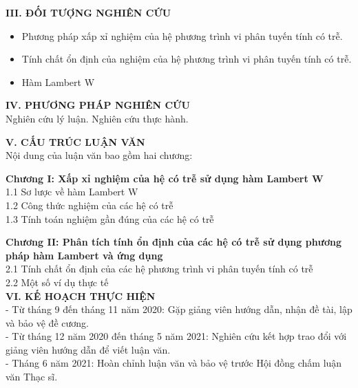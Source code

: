 \documentclass[12pt,oneside,portrait,a4paper]{book}
\theoremstyle{definition}
\theoremstyle{plain}
\begin{document}
\vspace{6pt}
\noindent 
\textbf{ III. ĐỐI TƯỢNG NGHIÊN CỨU}
\begin{itemize}
\item Phương pháp xấp xỉ nghiệm của hệ phương trình vi phân tuyến tính có trễ.
\item Tính chất ổn định của nghiệm của hệ phương trình vi phân tuyến tính có trễ.
\item Hàm Lambert W
\end{itemize}

\pagebreak

\vspace{6pt}
\noindent 
\textbf{ IV. PHƯƠNG PHÁP NGHIÊN CỨU}\\
\hspace*{0,5cm} Nghiên cứu lý luận. Nghiên cứu thực hành.

\vspace{6pt}
\noindent 
\textbf{ V. CẤU TRÚC LUẬN VĂN}\\
\hspace*{1cm} Nội dung của luận văn bao gồm hai chương:


\hspace*{0,5cm}\textbf{Chương I: Xấp xỉ nghiệm của hệ có trễ sử dụng hàm Lambert W}\\
\hspace*{1cm} 1.1 Sơ lược về hàm Lambert W \\
\hspace*{1cm} 1.2 Công thức nghiệm của các hệ có trễ \\
\hspace*{1cm} 1.3 Tính toán nghiệm gần đúng của các hệ có trễ 

\vskip 0.5cm 
\hspace*{0,5cm}\textbf{Chương II: Phân tích tính ổn định của các hệ có trễ sử dụng phương pháp hàm Lambert và ứng dụng}\\
\hspace*{1cm} 2.1 Tính chất ổn định của các hệ phương trình vi phân tuyến tính có trễ \\
\hspace*{1cm} 2.2 Một số ví dụ thực tế \\

\vspace{6pt}
\noindent 
\textbf{ VI. KẾ HOẠCH THỰC HIỆN}\\
\hspace*{1cm} - Từ tháng 9 đến tháng 11 năm 2020: Gặp giảng viên hướng dẫn, nhận đề tài, lập và bảo vệ đề cương.\\
\hspace*{1cm} - Từ tháng 12 năm 2020 đến tháng 5 năm 2021: Nghiên cứu kết hợp trao đổi với giảng viên hướng dẫn để viết luận văn.\\
\hspace*{1cm} - Tháng 6 năm 2021: Hoàn chỉnh luận văn và bảo vệ trước Hội đồng chấm luận văn Thạc sĩ.\\
\end{document}

